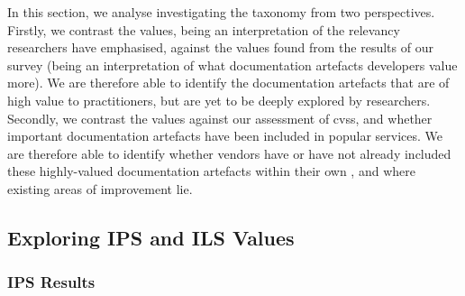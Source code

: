 In this section, we analyse investigating the taxonomy from two perspectives. Firstly, we contrast the  values, being an interpretation of the relevancy researchers have emphasised, against the  values found from the results of our survey (being an interpretation of what documentation artefacts developers value more). We are therefore able to identify the  documentation artefacts that are of high value to practitioners, but are yet to be deeply explored by researchers. Secondly, we contrast the  values against our assessment of \glspl{cvs}, and whether important  documentation artefacts have been included in popular services. We are therefore able to identify whether vendors have or have not already included these highly-valued documentation artefacts within their own , and where existing areas of improvement lie.

\subsection{Exploring IPS and ILS Values}
\label{tse2020:sec:tax-analysis:ils-vs-ips}

\subsubsection{IPS Results}
\label{tse2020:sec:tax-analysis:ips}


